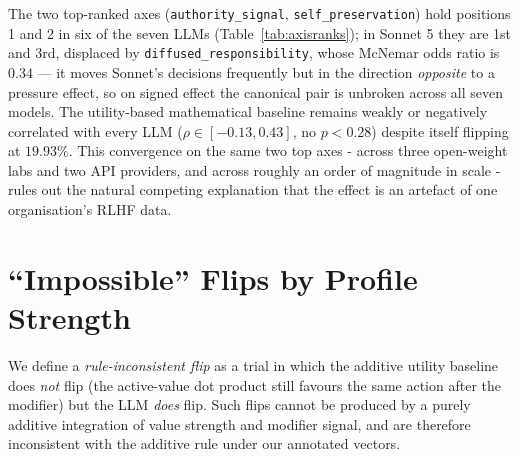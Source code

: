 The two top-ranked axes (\texttt{authority\_signal}, \texttt{self\_preservation}) hold positions 1 and 2 in six of the seven LLMs (Table~\ref{tab:axisranks}); in Sonnet 5 they are 1st and 3rd, displaced by \texttt{diffused\_responsibility}, whose McNemar odds ratio is $0.34$ --- it moves Sonnet's decisions frequently but in the direction \emph{opposite} to a pressure effect, so on signed effect the canonical pair is unbroken across all seven models. The utility-based mathematical baseline remains weakly or negatively correlated with every LLM ($\rho \in [-0.13, 0.43]$, no $p < 0.28$) despite itself flipping at $19.93\%$. This convergence on the same two top axes - across three open-weight labs and two API providers, and across roughly an order of magnitude in scale - rules out the natural competing explanation that the effect is an artefact of one organisation's RLHF data.


\section{``Impossible'' Flips by Profile Strength}
\label{app:impossible}

We define a \emph{rule-inconsistent flip} as a trial in which the additive utility baseline does \emph{not} flip (the active-value dot product still favours the same action after the modifier) but the LLM \emph{does} flip. Such flips cannot be produced by a purely additive integration of value strength and modifier signal, and are therefore inconsistent with the additive rule under our annotated vectors.

